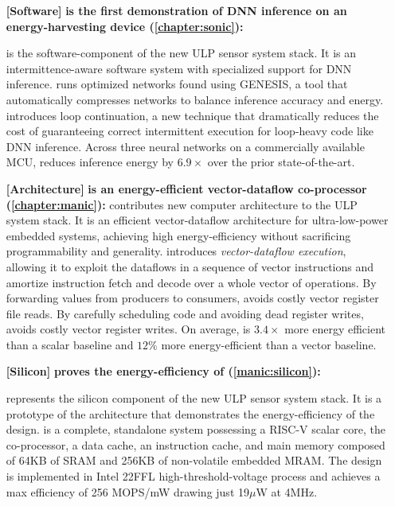 \begin{itemize}

\item[\textbf{[Software]}]
\textbf{\sonic is the first demonstration of DNN inference on an energy-harvesting device (\autoref{chapter:sonic}): }

\sonic is the software-component of the new ULP sensor system stack.
% 
It is an intermittence-aware software system with specialized support for DNN inference. 
% 
\sonic runs optimized networks found using GENESIS, a tool that automatically compresses networks to balance inference accuracy and energy.
% 
\sonic introduces loop continuation, a new technique that dramatically reduces the cost of guaranteeing correct intermittent execution for loop-heavy code like DNN inference. 
% 
Across three neural networks on a commercially available MCU, \sonic reduces inference energy by $6.9\times$ over the prior state-of-the-art.

\item[\textbf{[Architecture]}]
\textbf{\manic is an energy-efficient vector-dataflow co-processor (\autoref{chapter:manic}): }
\manic contributes new computer architecture to the ULP system stack.
% 
It is an efficient vector-dataflow architecture for ultra-low-power embedded systems, achieving high energy-efficiency without sacrificing programmability and generality.
% 
\manic introduces \emph{vector-dataflow execution}, allowing it to exploit the
dataflows in a sequence of vector instructions and amortize instruction
fetch and decode over a whole vector of operations.
%
By forwarding values from producers to consumers, \manic avoids costly vector register file reads.
% 
By carefully scheduling code and avoiding dead register writes, \manic avoids costly vector register writes.
% 
On average, \manic is $3.4\times$ more energy efficient than a scalar baseline and $12\%$ more energy-efficient than a vector baseline.

\item[\textbf{[Silicon]}]
\textbf{\msilicon proves the energy-efficiency of \manic (\autoref{manic:silicon}): }

\msilicon represents the silicon component of the new ULP sensor system stack.
% 
It is a prototype of the \manic architecture that demonstrates the energy-efficiency of the design.
% 
\msilicon is a complete, standalone system possessing a RISC-V scalar core, the \manic co-processor, a data cache, an instruction cache, and main memory composed of 64KB of SRAM and 256KB of non-volatile embedded MRAM.
% 
The design is implemented in Intel 22FFL high-threshold-voltage process and achieves a max efficiency of 256 MOPS/mW drawing just 19$\mu$W at 4MHz.
% 


\end{itemize}
